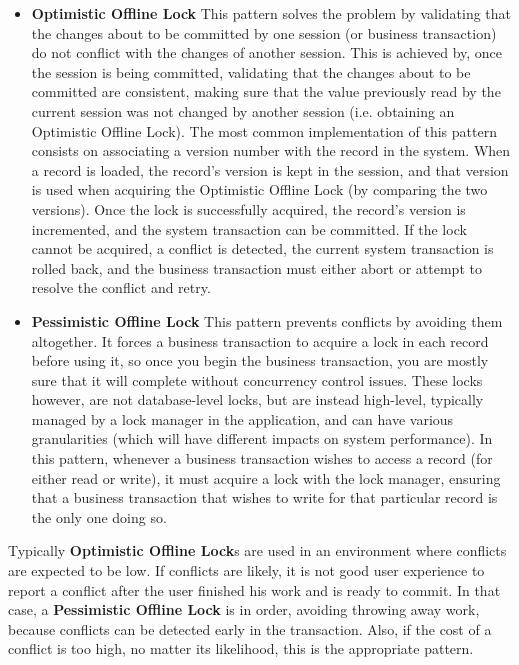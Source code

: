 \documentclass{llncs}
\begin{document}
\begin{itemize}
\item {\bf Optimistic Offline Lock} This pattern solves the problem by
  validating that the changes about to be committed by one session (or
  business transaction) do not conflict with the changes of another
  session. This is achieved by, once the session is being committed,
  validating that the changes about to be committed are consistent,
  making sure that the value previously read by the current session
  was not changed by another session (i.e. obtaining an Optimistic
  Offline Lock).  The most common implementation of this pattern
  consists on associating a version number with the record in the
  system. When a record is loaded, the record's version is kept in the
  session, and that version is used when acquiring the Optimistic
  Offline Lock (by comparing the two versions). Once the lock is
  successfully acquired, the record's version is incremented, and the
  system transaction can be committed. If the lock cannot be acquired,
  a conflict is detected, the current system transaction is rolled
  back, and the business transaction must either abort or attempt to
  resolve the conflict and retry.

\item {\bf Pessimistic Offline Lock} This pattern prevents conflicts
  by avoiding them altogether. It forces a business transaction to
  acquire a lock in each record before using it, so once you begin the
  business transaction, you are mostly sure that it will complete
  without concurrency control issues. These locks however, are not
  database-level locks, but are instead high-level, typically managed
  by a lock manager in the application, and can have various
  granularities (which will have different impacts on system
  performance). In this pattern, whenever a business transaction
  wishes to access a record (for either read or write), it must
  acquire a lock with the lock manager, ensuring that a business
  transaction that wishes to write for that particular record is the
  only one doing so.
\end{itemize}

Typically {\bf Optimistic Offline Lock}s are used in an environment
where conflicts are expected to be low. If conflicts are likely, it is
not good user experience to report a conflict after the user finished
his work and is ready to commit. In that case, a {\bf Pessimistic
  Offline Lock} is in order, avoiding throwing away work, because
conflicts can be detected early in the transaction. Also, if the cost
of a conflict is too high, no matter its likelihood, this is the
appropriate pattern.
\end{document}
